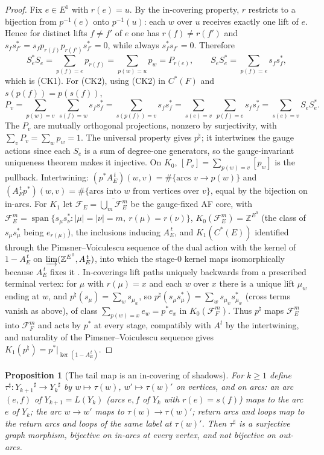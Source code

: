 \documentclass[11pt]{amsart}
\numberwithin{equation}{section}
\newtheorem{proposition}[theorem]{Proposition}
\theoremstyle{definition}
\theoremstyle{remark}
\newcommand{\Z}{\mathbb{Z}}
\newcommand{\shadow}[1]{{#1}^{\sharp}}
\begin{document}
\begin{proof}
Fix $e\in E^1$ with $r(e)=u$. By the in-covering property, $r$ restricts to a bijection
from $p^{-1}(e)$ onto $p^{-1}(u)$: each $w$ over $u$ receives exactly one lift of $e$.
Hence for distinct lifts $f\ne f'$ of $e$ one has $r(f)\ne r(f')$ and
$s_fs_{f'}^*=s_fp_{r(f)}p_{r(f')}s_{f'}^*=0$, while always $s_f^*s_{f'}=0$. Therefore
\[
S_e^*S_e=\sum_{p(f)=e}p_{r(f)}=\sum_{p(w)=u}p_w=P_{r(e)},\qquad
S_eS_e^*=\sum_{p(f)=e}s_fs_f^* ,
\]
which is (CK1). For (CK2), using (CK2) in $C^*(F)$ and $s(p(f))=p(s(f))$,
\[
P_v=\sum_{p(w)=v}\ \sum_{s(f)=w}s_fs_f^*=\sum_{s(p(f))=v}s_fs_f^*
=\sum_{s(e)=v}\ \sum_{p(f)=e}s_fs_f^*=\sum_{s(e)=v}S_eS_e^* .
\]
The $P_v$ are mutually orthogonal projections, nonzero by surjectivity, with
$\sum_vP_v=\sum_wp_w=1$. The universal property gives $p^\natural$; it intertwines the
gauge actions since each $S_e$ is a sum of degree-one generators, so the gauge-invariant
uniqueness theorem \cite[Thm.~2.2]{R} makes it injective. On $K_0$,
$[P_v]=\sum_{p(w)=v}[p_w]$ is the pullback. Intertwining: $(p^*A_E^{\,t})(w,v)=
\#\{\text{arcs }v\to p(w)\}$ and $(A_F^{\,t}p^*)(w,v)=\#\{\text{arcs into }w\text{ from
vertices over }v\}$, equal by the bijection on in-arcs. For $K_1$ let
$\mathcal F_E=\overline{\bigcup_m\mathcal F_E^m}$ be the gauge-fixed AF core, with
$\mathcal F_E^m=\operatorname{span}\{s_\mu s_\nu^*:|\mu|=|\nu|=m,\ r(\mu)=r(\nu)\}$,
$K_0(\mathcal F_E^m)=\Z^{E^0}$ (the class of $s_\mu s_\mu^*$ being $e_{r(\mu)}$), the
inclusions inducing $A_E^{\,t}$, and $K_1(C^*(E))$ identified through the
Pimsner--Voiculescu sequence of the dual action with the kernel of $1-A_E^{\,t}$ on
$\varinjlim(\Z^{E^0},A_E^{\,t})$, into which the stage-$0$ kernel maps isomorphically
because $A_E^{\,t}$ fixes it \cite[Ch.~7]{R}. In-coverings lift paths uniquely backwards
from a prescribed terminal vertex: for $\mu$ with $r(\mu)=x$ and each $w$ over $x$ there
is a unique lift $\mu_w$ ending at $w$, and $p^\natural(s_\mu)=\sum_ws_{\mu_w}$, so
$p^\natural(s_\mu s_\mu^*)=\sum_ws_{\mu_w}s_{\mu_w}^*$ (cross terms vanish as above),
of class $\sum_{p(w)=x}e_w=p^*e_x$ in $K_0(\mathcal F_F^m)$. Thus $p^\natural$ maps
$\mathcal F_E^m$ into $\mathcal F_F^m$ and acts by $p^*$ at every stage, compatibly with
$A^{t}$ by the intertwining, and naturality of the Pimsner--Voiculescu sequence gives
$K_1(p^\natural)=p^*|_{\ker(1-A_E^{\,t})}$.
\end{proof}

\begin{proposition}[The tail map is an in-covering of shadows]\label{prop:tausharp}
For $k\ge1$ define $\shadow\tau\colon\shadow{Y_{k+1}}\to\shadow{Y_k}$ by
$w\mapsto\tau(w)$, $w'\mapsto\tau(w)'$ on vertices, and on arcs: an arc $(e,f)$ of
$Y_{k+1}=L(Y_k)$ (arcs $e,f$ of $Y_k$ with $r(e)=s(f)$) maps to the arc $e$ of $Y_k$;
the arc $w\to w'$ maps to $\tau(w)\to\tau(w)'$; return arcs and loops map to the return
arcs and loops of the same label at $\tau(w)'$. Then $\shadow\tau$ is a surjective graph
morphism, bijective on in-arcs at every vertex, and not bijective on out-arcs.
\end{proposition}
\end{document}
